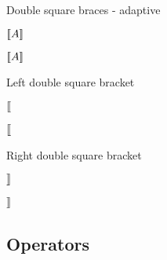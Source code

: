 \documentclass[DIV15]{scrartcl}
\newcommand{\scm}[3]{%
  \noindent
  \def\tmpp{#1}%
  \def\tmp{#3}%
  \begin{minipage}{\linewidth}\vspace{0.5ex}
  \begin{minipage}[t]{0.17\linewidth}
    \texttt{\expandafter\foo\meaning\tmpp}
  \end{minipage}
  \begin{minipage}[t]{0.37\linewidth}%
    #2
  \end{minipage}
  \begin{minipage}[t]{0.24\linewidth}%
    \texttt{\expandafter\foo\meaning\tmp}
  \end{minipage}
  \begin{minipage}[t]{0.20\linewidth}
    #3
  \end{minipage}\vspace{0.5ex}
  \end{minipage}\newline\noindent
}
\def\foo#1>{}
\begin{document}
\scm{\dbr}{Double square braces - adaptive}{$\dbr{A}$} %
\scm{\dbrl}{Left double square bracket}{$\mathopen{[\mkern-2.5mu[}$}
\scm{\dbrr}{Right double square bracket}{$\mathclose{]\mkern-2.5mu]}$}
%
\subsection{Operators}

\end{document}
